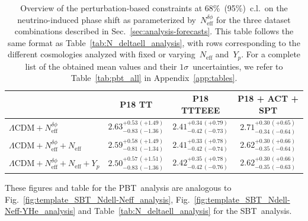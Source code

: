 \documentclass[11pt]{article}
\numberwithin{equation}{section}
\newcommand{\Neff}{N_\mathrm{eff}}
\newcommand{\Nphase}{N_\mathrm{eff}^{\delta\phi}}
\begin{document}
\begin{table}
	\centering
	\begin{tabular}{l c c c}
			\toprule
														& P18 TT										& P18 TTTEEE									& P18 + ACT + SPT								\\
			\midrule[0.065em]
		$\Lambda\mathrm{CDM} + \Nphase$					& $2.63^{+0.53\, (+1.49)}_{-0.83\, (-1.36)}$	& $2.41^{+0.34\, (+0.79)}_{-0.42\, (-0.73)}$	& $2.71^{+0.30\, (+0.65)}_{-0.34\, (-0.64)}$	\\[4pt]
		$\Lambda\mathrm{CDM} + \Nphase + \Neff$ 		& $2.59^{+0.58\, (+1.49)}_{-0.81\, (-1.34)}$	& $2.41^{+0.33\, (+0.78)}_{-0.42\, (-0.74)}$	& $2.62^{+0.30\, (+0.66)}_{-0.35\, (-0.64)}$	\\[4pt]
		$\Lambda\mathrm{CDM} + \Nphase + \Neff + Y_p$	& $2.50^{+0.57\, (+1.51)}_{-0.83\, (-1.36)}$	& $2.42^{+0.35\, (+0.78)}_{-0.42\, (-0.76)}$	& $2.62^{+0.30\, (+0.66)}_{-0.35\, (-0.63)}$	\\[2pt]
			\bottomrule
	\end{tabular}
	\caption{Overview of the perturbation-based constraints at 68\%~(95\%)~c.l.\ on the neutrino-induced phase shift as parameterized by~$\Nphase$ for the three dataset combinations described in Sec.~\ref{sec:analysis-forecasts}. This table follows the same format as Table~\ref{tab:N_deltaell_analysis}, with rows corresponding to the different cosmologies analyzed with fixed or varying~$\Neff$ and~$Y_p$. For a complete list of the obtained mean values and their $1\sigma$~uncertainties, we refer to Table~\ref{tab:pbt_all} in Appendix~\ref{app:tables}.}
	\label{tab:N_deltaphi_analysis}
\end{table}
These figures and table for the PBT~analysis are analogous to Fig.~\ref{fig:template_SBT_Ndell-Neff_analysis}, Fig.~\ref{fig:template_SBT_Ndell-Neff-YHe_analysis} and Table~\ref{tab:N_deltaell_analysis} for the SBT~analysis.\medskip
\end{document}
